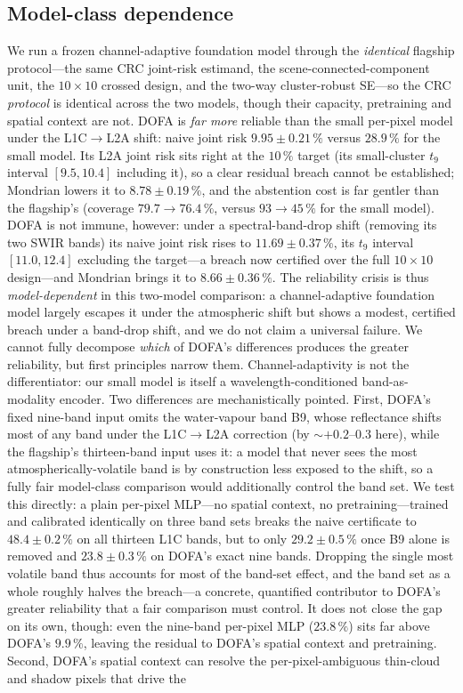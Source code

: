 \documentclass[preprint,3p,times]{elsarticle}
\begin{document}
\subsection{Model-class dependence}
\label{sec:modelclass}
We run a frozen channel-adaptive foundation model \citep[DOFA,][]{xiong2024dofa} through the \emph{identical} flagship protocol---the same CRC joint-risk estimand, the scene-connected-component unit, the $10 \times 10$ crossed design, and the two-way cluster-robust SE---so the CRC \emph{protocol} is identical across the two models, though their capacity, pretraining and spatial context are not. DOFA is \emph{far more} reliable than the small per-pixel model under the L1C$\to$L2A shift: naive joint risk $9.95 \pm 0.21\,\%$ versus $28.9\,\%$ for the small model. Its L2A joint risk sits right at the $10\,\%$ target (its small-cluster $t_9$ interval $[9.5, 10.4]$ including it), so a clear residual breach cannot be established; Mondrian lowers it to $8.78 \pm 0.19\,\%$, and the abstention cost is far gentler than the flagship's (coverage $79.7 \to 76.4\,\%$, versus $93 \to 45\,\%$ for the small model). DOFA is not immune, however: under a spectral-band-drop shift (removing its two SWIR bands) its naive joint risk rises to $11.69 \pm 0.37\,\%$, its $t_9$ interval $[11.0, 12.4]$ excluding the target---a breach now certified over the full $10 \times 10$ design---and Mondrian brings it to $8.66 \pm 0.36\,\%$. The reliability crisis is thus \emph{model-dependent} in this two-model comparison: a channel-adaptive foundation model largely escapes it under the atmospheric shift but shows a modest, certified breach under a band-drop shift, and we do not claim a universal failure. We cannot fully decompose \emph{which} of DOFA's differences produces the greater reliability, but first principles narrow them. Channel-adaptivity is not the differentiator: our small model is itself a wavelength-conditioned band-as-modality encoder. Two differences are mechanistically pointed. First, DOFA's fixed nine-band input omits the water-vapour band B9, whose reflectance shifts most of any band under the L1C$\to$L2A correction (by ${\sim}{+}0.2$--$0.3$ here), while the flagship's thirteen-band input uses it: a model that never sees the most atmospherically-volatile band is by construction less exposed to the shift, so a fully fair model-class comparison would additionally control the band set. We test this directly: a plain per-pixel MLP---no spatial context, no pretraining---trained and calibrated identically on three band sets breaks the naive certificate to $48.4 \pm 0.2\,\%$ on all thirteen L1C bands, but to only $29.2 \pm 0.5\,\%$ once B9 alone is removed and $23.8 \pm 0.3\,\%$ on DOFA's exact nine bands. Dropping the single most volatile band thus accounts for most of the band-set effect, and the band set as a whole roughly halves the breach---a concrete, quantified contributor to DOFA's greater reliability that a fair comparison must control. It does not close the gap on its own, though: even the nine-band per-pixel MLP ($23.8\,\%$) sits far above DOFA's $9.9\,\%$, leaving the residual to DOFA's spatial context and pretraining. Second, DOFA's spatial context can resolve the per-pixel-ambiguous thin-cloud and shadow pixels that drive the 
\end{document}
